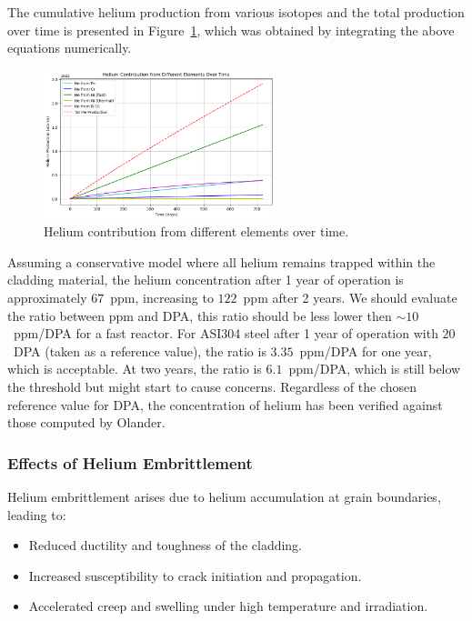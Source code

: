 The cumulative helium production from various isotopes and the total production over time is presented in Figure~\ref{fig:helium_production}, which was obtained by integrating the above equations numerically.

\begin{figure}[H]
    \centering
    \includegraphics[width=0.6\textwidth]{He_production.png}
    \caption{Helium contribution from different elements over time.}
    \label{fig:helium_production}
\end{figure}

Assuming a conservative model where all helium remains trapped within the cladding material, the helium concentration after 1 year of operation is approximately $67$~ppm, increasing to $122$~ppm after 2 years.  
We should evaluate the ratio between ppm and DPA, this ratio should be less lower then $\sim 10$~ppm/DPA for a fast reactor. For ASI304 steel after 1 year of operation with $20$~DPA (taken as a reference value), 
the ratio is $3.35$~ppm/DPA for one year, which is acceptable. At two years, the ratio is $6.1$~ppm/DPA, which is still below the threshold but might start to cause concerns.
Regardless of the chosen reference value for DPA, the concentration of helium has been verified against those computed by Olander.

\subsubsection{Effects of Helium Embrittlement}

Helium embrittlement arises due to helium accumulation at grain boundaries, leading to:
\begin{itemize}
    \item Reduced ductility and toughness of the cladding.
    \item Increased susceptibility to crack initiation and propagation.
    \item Accelerated creep and swelling under high temperature and irradiation.
\end{itemize}